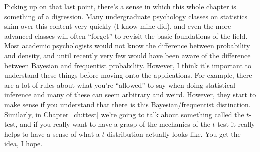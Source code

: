Picking up on that last point, there's a sense in which this whole chapter is something of a digression. Many undergraduate psychology classes on statistics skim over this content very quickly (I know mine did), and even the more advanced classes will often ``forget'' to revisit the basic foundations of the field. Most academic psychologists would not know the difference between probability and density, and until recently very few would have been aware of the difference between Bayesian and frequentist probability. However, I think it's important to understand these things before moving onto the applications. For example, there are a lot of rules about what you're ``allowed'' to say when doing statistical inference and many of these can seem arbitrary and weird. However, they start to make sense if you understand that there is this Bayesian/frequentist distinction. Similarly, in Chapter~\ref{ch:ttest} we're going to talk about something called the $t$-test, and if you really want to have a grasp of the mechanics of the $t$-test it really helps to have a sense of what a $t$-distribution actually looks like. You get the idea, I hope.






